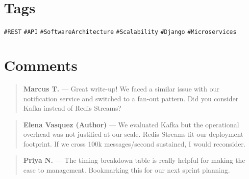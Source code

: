 \documentclass[
    language=english,
    doctype=blog-post,
    institution=none,
]{../../omnilatex}
\begin{document}
\section*{Tags}

\texttt{\#REST} \texttt{\#API} \texttt{\#SoftwareArchitecture} \texttt{\#Scalability}
\texttt{\#Django} \texttt{\#Microservices}

\section*{Comments}

\begin{quote}
    \textbf{Marcus T.} --- Great write-up! We faced a similar issue with our
    notification service and switched to a fan-out pattern. Did you consider
    Kafka instead of Redis Streams?
\end{quote}

\begin{quote}
    \textbf{Elena Vasquez (Author)} --- We evaluated Kafka but the operational
    overhead was not justified at our scale. Redis Streams fit our deployment
    footprint. If we cross 100k messages/second sustained, I would reconsider.
\end{quote}

\begin{quote}
    \textbf{Priya N.} --- The timing breakdown table is really helpful for
    making the case to management. Bookmarking this for our next sprint planning.
\end{quote}
\end{document}
